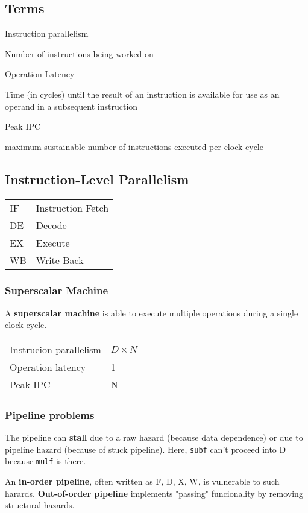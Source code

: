 \documentclass[a4paper, fontsize=8pt, landscape, DIV=1]{scrartcl}
\makeatletter
\renewenvironment{outline}[1][]{%
  \ifthenelse{\equal{#1}{}}{}{\renewcommand{\ol@type}{#1}}%
  \ol@z%
  \newcommand{\0}{\ol@toz\ol@z}%
  \newcommand{\1}{\vspace{\dimexpr\outlinespacingscalar\baselineskip-\baselineskip}\ol@toi\ol@i\item}%
  \newcommand{\2}{\vspace{\dimexpr\outlinespacingscalartwo\baselineskip-\baselineskip}\ol@toii\ol@ii\item}%
  \newcommand{\3}{\vspace{\dimexpr\outlinespacingscalar\baselineskip-\baselineskip}\ol@toiii\ol@iii\item}%
  \newcommand{\4}{\vspace{\dimexpr\outlinespacingscalar\baselineskip-\baselineskip}\ol@toiiii\ol@iiii\item}%
}{%
  \ol@toz\ol@exit%
}
\def\outlinespacingscalar{0.5}
\def\outlinespacingscalartwo{0.5}
\makeatother
\begin{document}
\begin{multicols*}{4}
  \subsection{Terms}
  \begin{outline}
    \1 Instruction parallelism
      \2 Number of instructions being worked on
    \1 Operation Latency
      \2 Time (in cycles) until the result of an instruction is available for use as
      an operand in a subsequent instruction
    \1 Peak IPC
      \2 maximum sustainable number of instructions executed per clock cycle
  \end{outline}

  \subsection{Instruction-Level Parallelism}
   \begin{tabularx}{\linewidth}{l X}
    IF & Instruction Fetch \\
    DE & Decode \\
    EX & Execute \\
    WB & Write Back
  \end{tabularx}

  \subsubsection{Superscalar Machine}
  A \textbf{superscalar machine} is able to execute multiple operations during a
  single clock cycle.
   \begin{tabularx}{\linewidth}{l l}
    {Instrucion parallelism} & $D\times N$ \\
    Operation latency & 1 \\
    Peak IPC & N
  \end{tabularx}

  \subsubsection{Pipeline problems}
  The pipeline can \textbf{stall} due to a raw hazard (because data dependence) or
  due to pipeline hazard (because of stuck pipeline). Here, \texttt{subf} can't proceed
  into D because \texttt{mulf} is there. 

  An \textbf{in-order pipeline}, often written as F, D, X, W, is vulnerable to such harards.
  \textbf{Out-of-order pipeline} implements "passing" funcionality by removing structural hazards.


\end{multicols*}
\end{document}
